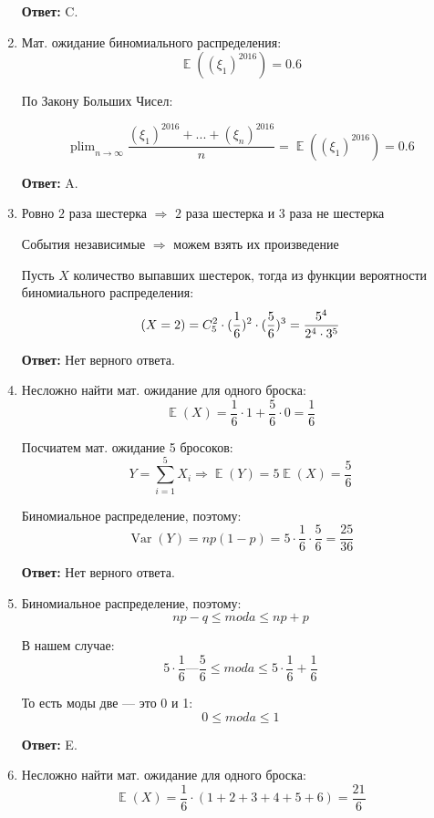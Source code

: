 \documentclass[a4paper]{article} %
\DeclareMathOperator*\plim{plim}
\DeclareMathOperator{\Var}{Var}
\DeclareMathOperator{\E}{\mathbb{E}}
\let\P\relax
\DeclareMathOperator{\P}{\mathbb{P}}
\renewcommand{\leq}{\leqslant}
\begin{document}
\begin{enumerate}
    \textbf{Ответ:} C.
    
    
    \item
    Мат. ожидание биномиального распределения:
    \[
    \E((\xi_1)^{2016}) = 0.6
    \]
    
    По Закону Больших Чисел:
    
    \[
    \plim_{n\to\infty} \frac{(\xi_1)^{2016} + ... + (\xi_n)^{2016}}{n} = \E((\xi_1)^{2016}) = 0.6
    \]
    
    \textbf{Ответ:} A.
    
    
    \item
    Ровно $2$ раза шестерка $\Rightarrow$ $2$ раза шестерка и  $3$ раза не шестерка
     
    События независимые $\Rightarrow$ можем взять их произведение
    
    Пусть $X$ количество выпавших шестерок, тогда из функции вероятности биномиального распределения:
    \[
    \P(X=2) = C_5^2 \cdot(\frac{1}{6})^2 \cdot (\frac{5}{6})^3 = \frac{5^4}{2^4\cdot3^5}
    \]
    
    \textbf{Ответ:} Нет верного ответа.
    
    
    \item
    Несложно найти мат. ожидание для одного броска:
    \[
    \E(X) = \frac{1}{6}\cdot1 + \frac{5}{6}\cdot0 = \frac{1}{6}
    \]
    
    Посчиатем мат. ожидание 5 бросоков:
    \[
    Y = \sum_{i=1}^{5} X_i \Rightarrow \E(Y) = 5\E(X) = \frac{5}{6}
    \]
    
    Биномиальное распределение, поэтому:
    \[
    \Var(Y) = np(1-p) = 5 \cdot \frac{1}{6} \cdot \frac{5}{6} = \frac{25}{36}
    \]
    
    \textbf{Ответ:} Нет верного ответа.
    
    
    \item
    Биномиальное распределение, поэтому:
    \[
    np-q \leq moda \leq np+p
    \]
    
    В нашем случае:
    \[
    5 \cdot \frac{1}{6} — \frac{5}{6} \leq moda \leq 5 \cdot \frac{1}{6} + \frac{1}{6}
    \]
    
    То есть моды две — это 0 и 1:
    \[
    0 \leq moda \leq 1
    \]
    
    \textbf{Ответ:} E.
    
    
    \item
    Несложно найти мат. ожидание для одного броска:
    \[
    \E(X) = \frac{1}{6}\cdot(1 + 2 + 3 + 4 + 5 + 6) = \frac{21}{6}
    \]
    

\end{enumerate}
\end{document}

